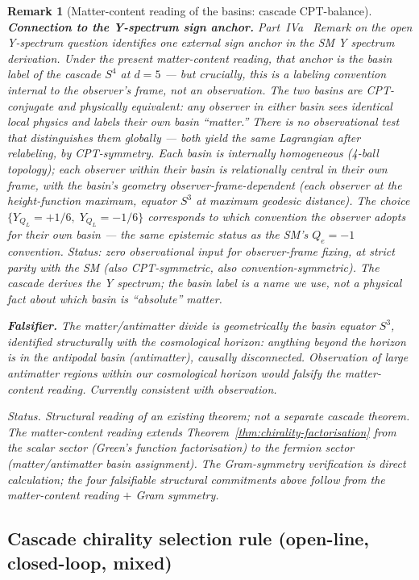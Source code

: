 \documentclass[12pt,a4paper]{article}
\newtheorem*{remark}{Remark}
\begin{document}
\begin{remark}[Matter-content reading of the basins: cascade CPT-balance]
\medskip\noindent\textbf{Connection to the Y-spectrum sign anchor.}
Part~IVa~\cite{part4a} Remark on the open Y-spectrum question identifies one external sign anchor in the SM Y spectrum derivation. Under the present matter-content reading, that anchor is the \emph{basin label} of the cascade $S^4$ at $d=5$ --- but crucially, this is \emph{a labeling convention internal to the observer's frame, not an observation}. The two basins are CPT-conjugate and physically equivalent: any observer in either basin sees identical local physics and labels their own basin ``matter.'' There is no observational test that distinguishes them globally --- both yield the same Lagrangian after relabeling, by CPT-symmetry. Each basin is internally homogeneous (4-ball topology); each observer within their basin is \emph{relationally central} in their own frame, with the basin's geometry observer-frame-dependent (each observer at the height-function maximum, equator $S^3$ at maximum geodesic distance). The choice $\{Y_{Q_L}=+1/6,\;Y_{Q_L}=-1/6\}$ corresponds to which convention the observer adopts for their own basin --- the same epistemic status as the SM's $Q_e=-1$ convention. Status: \emph{zero observational input} for observer-frame fixing, at strict parity with the SM (also CPT-symmetric, also convention-symmetric). The cascade derives the Y \emph{spectrum}; the basin label is a name we use, not a physical fact about which basin is ``absolute'' matter.

\medskip\noindent\textbf{Falsifier.}
The matter/antimatter divide is geometrically the basin equator $S^3$, identified structurally with the cosmological horizon: anything beyond the horizon is in the antipodal basin (antimatter), causally disconnected. Observation of large antimatter regions \emph{within} our cosmological horizon would falsify the matter-content reading. Currently consistent with observation.

\medskip\noindent\emph{Status.} Structural reading of an existing theorem; not a separate cascade theorem. The matter-content reading extends Theorem~\ref{thm:chirality-factorisation} from the scalar sector (Green's function factorisation) to the fermion sector (matter/antimatter basin assignment). The Gram-symmetry verification is direct calculation; the four falsifiable structural commitments above follow from the matter-content reading $+$ Gram symmetry.
\end{remark}

\subsection{Cascade chirality selection rule (open-line, closed-loop, mixed)}\label{subsec:chirality-selection-rule}
\end{document}
